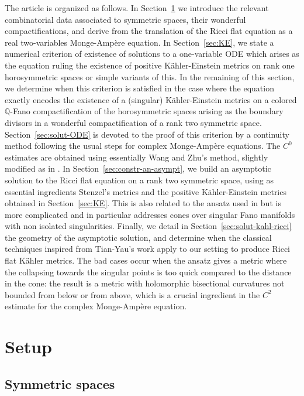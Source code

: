 \documentclass[JEP,XML,SOM,Unicode, NoEqCountersInSection, NoFloatCountersInSection]{cedram}
\theoremstyle{plain}
\theoremstyle{definition}
\begin{document}
The article is organized as follows. In Section~\ref{sec:setup} we
introduce the relevant combinatorial data associated to symmetric
spaces, their wonderful compactifications, and derive from
\cite{DelHoro} the translation of the Ricci flat equation as a real
two-variables Monge-Ampère equation. In Section~\ref{sec:KE}, we state
a numerical criterion of existence of solutions to a one-variable ODE
which arises as the equation ruling the existence of positive
Kähler-Einstein metrics on rank one horosymmetric spaces or simple
variants of this. In the remaining of this section, we determine when
this criterion is satisfied in the case where the equation exactly
encodes the existence of a (singular) Kähler-Einstein metrics on a
colored $\mathbb{Q}$-Fano compactification of the horosymmetric spaces
arising as the boundary divisors in a wonderful compactification of a
rank two symmetric space. Section~\ref{sec:solut-ODE} is devoted to
the proof of this criterion by a continuity method following the usual
steps for complex Monge-Ampère equations. The $C^0$ estimates are
obtained using essentially Wang and Zhu's method, slightly modified as
in \cite{DelKE}. In Section~\ref{sec:constr-an-asympt}, we build an
asymptotic solution to the Ricci flat equation on a rank two symmetric
space, using as essential ingredients Stenzel's metrics and the
positive Kähler-Einstein metrics obtained in
Section~\ref{sec:KE}. This is also related to the ansatz used in
\cite{CDR16,Li17,Sze17} but is more complicated and in particular
addresses cones over singular Fano manifolds with non isolated
singularities. Finally, we detail in
Section~\ref{sec:solut-kahl-ricci} the geometry of the asymptotic
solution, and determine when the classical techniques inspired from
Tian-Yau's work apply to our setting to produce Ricci flat Kähler
metrics. The bad cases occur when the ansatz gives a metric where the collapsing towards the singular points is too quick compared to the distance in the cone: the result is a metric with holomorphic bisectional curvatures not bounded from below or from above, which is a crucial ingredient in the $C^2$ estimate for the complex Monge-Ampère equation.

\section{Setup}
\label{sec:setup}

\subsection{Symmetric spaces}
\end{document}
